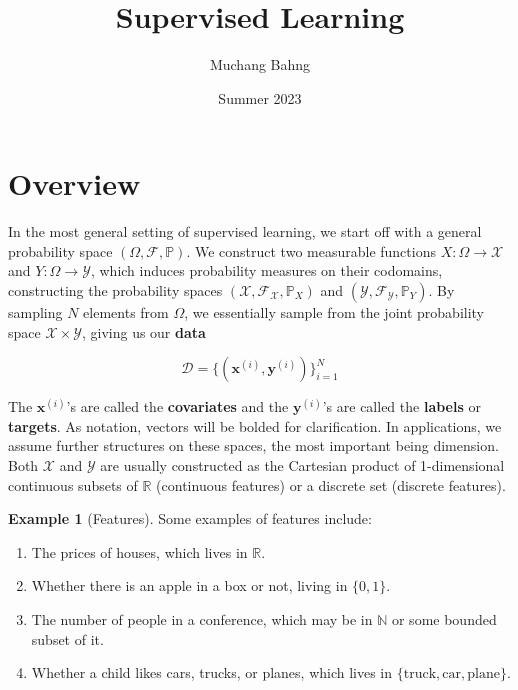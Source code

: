 \documentclass{article}
\theoremstyle{definition}
\newtheorem{example}{Example}[section]
\begin{document}
\pagestyle{fancy}

\cfoot{\thepage / \pageref{LastPage}}

\title{Supervised Learning}
\author{Muchang Bahng}
\date{Summer 2023}

\maketitle
\tableofcontents
\pagebreak 

\section{Overview}

  In the most general setting of supervised learning, we start off with a general probability space $(\Omega, \mathcal{F}, \mathbb{P})$. We construct two measurable functions $X: \Omega \rightarrow \mathcal{X}$ and $Y: \Omega \rightarrow \mathcal{Y}$, which induces probability measures on their codomains, constructing the probability spaces $(\mathcal{X}, \mathcal{F}_{\mathcal{X}}, \mathbb{P}_X)$ and $(\mathcal{Y}, \mathcal{F}_{\mathcal{Y}}, \mathbb{P}_Y)$. By sampling $N$ elements from $\Omega$, we essentially sample from the joint probability space $\mathcal{X} \times \mathcal{Y}$, giving us our \textbf{data} 

    \[\mathcal{D} = \{(\mathbf{x}^{(i)}, \mathbf{y}^{(i)}) \}_{i=1}^N\]

  The $\mathbf{x}^{(i)}$'s are called the \textbf{covariates} and the $\mathbf{y}^{(i)}$'s are called the \textbf{labels} or \textbf{targets}. As notation, vectors will be bolded for clarification. In applications, we assume further structures on these spaces, the most important being dimension. Both $\mathcal{X}$ and $\mathcal{Y}$ are usually constructed as the Cartesian product of 1-dimensional continuous subsets of $\mathbb{R}$ (continuous features) or a discrete set (discrete features). 

  \begin{example}[Features]
    Some examples of features include: 
    \begin{enumerate}
      \item The prices of houses, which lives in $\mathbb{R}$. 
      \item Whether there is an apple in a box or not, living in $\{0, 1\}$. 
      \item The number of people in a conference, which may be in $\mathbb{N}$ or some bounded subset of it. 
      \item Whether a child likes cars, trucks, or planes, which lives in $\{\text{truck}, \text{car}, \text{plane}\}$. 
    \end{enumerate}
  \end{example}
\end{document}
